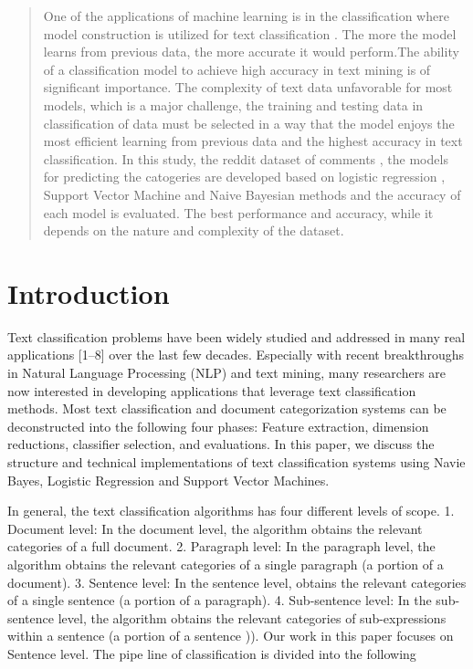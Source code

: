 \documentclass[conference]{IEEEtran}
\begin{document}
\title{


}

\author{
	}

\maketitle
\begin{abstract}
One of the applications of machine learning is in the
classification where model construction is utilized for
text classification . The more the model learns from previous
data, the more accurate it would perform.The ability of a
classification model to achieve high accuracy in text mining 
is of significant importance. The complexity of text data
unfavorable for most models, which is a major challenge, the
training and testing data in classification of data must be selected
in a way that the model enjoys the most efficient learning from
previous data and the highest accuracy in text classification.
In this study, the reddit dataset of comments , the models
for predicting the catogeries  are developed based on
logistic regression , Support Vector Machine and Naive Bayesian methods and the accuracy of each model is evaluated. The best performance and accuracy, while it depends
on the nature and complexity of the dataset.
\end{abstract}
\section{Introduction}


Text classification problems have been widely studied and addressed in many real applications [1–8]
over the last few decades. Especially with recent breakthroughs in Natural Language Processing
(NLP) and text mining, many researchers are now interested in developing applications that leverage
text classification methods. Most text classification and document categorization systems can be
deconstructed into the following four phases: Feature extraction, dimension reductions, classifier
selection, and evaluations. In this paper, we discuss the structure and technical implementations of text classification systems using Navie Bayes, Logistic Regression and Support Vector Machines. 

In general, the text classification algorithms has four different levels of scope.
1. Document level: In the document level, the algorithm obtains the relevant categories of a full
document.
2. Paragraph level: In the paragraph level, the algorithm obtains the relevant categories of a single
paragraph (a portion of a document).
3. Sentence level: In the sentence level, obtains the relevant categories of a single sentence (a portion
of a paragraph).
4. Sub-sentence level: In the sub-sentence level, the algorithm obtains the relevant categories of
sub-expressions within a sentence (a portion of a sentence )). Our work in this paper focuses on Sentence level. 
The pipe line of classification is divided into the following 
\end{document}
